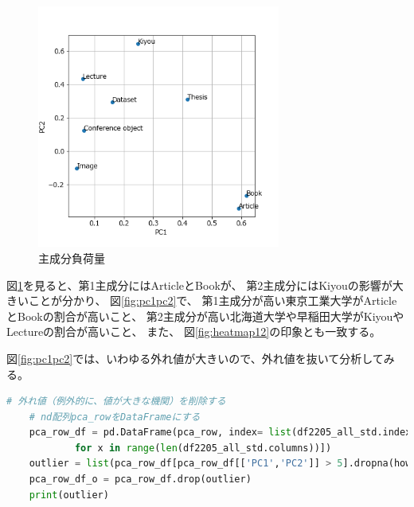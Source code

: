 \documentclass[submit,noauthor]{ono}
\begin{document}
\begin{figure}[h]
	\includegraphics[width=8cm]{./picture/principal_component_loading.png}
	\caption{主成分負荷量}
	\label{fig:pcloading}
\end{figure}

図\ref{fig:pcloading}を見ると、第1主成分にはArticleとBookが、
第2主成分にはKiyouの影響が大きいことが分かり、
図\ref{fig:pc1pc2}で、
第1主成分が高い東京工業大学がArticleとBookの割合が高いこと、
第2主成分が高い北海道大学や早稲田大学がKiyouやLectureの割合が高いこと、
また、
図\ref{fig:heatmap12}の印象とも一致する。

図\ref{fig:pc1pc2}では、いわゆる外れ値が大きいので、外れ値を抜いて分析してみる。

\begin{lstlisting}[language=Python,breaklines]
	# 外れ値（例外的に、値が大きな機関）を削除する
	# nd配列pca_rowをDataFrameにする
	pca_row_df = pd.DataFrame(pca_row, index= list(df2205_all_std.index), columns=["PC{}".format(x + 1)
			for x in range(len(df2205_all_std.columns))])
	outlier = list(pca_row_df[pca_row_df[['PC1','PC2']] > 5].dropna(how='all').index)
	pca_row_df_o = pca_row_df.drop(outlier)
	print(outlier)
\end{lstlisting}
\end{document}

